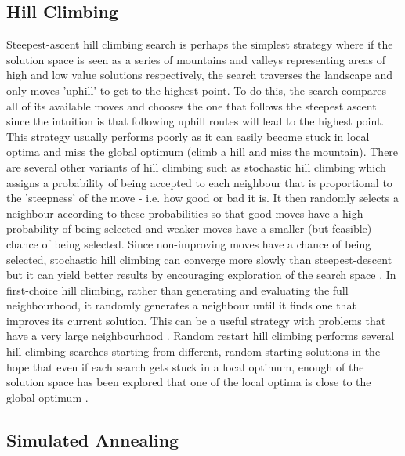 \subsection{Hill Climbing}

Steepest-ascent hill climbing search \citep{russell2016artificial} is perhaps the simplest strategy where if the solution space is seen as a series of mountains and valleys representing areas of high and low value solutions respectively, the search traverses the landscape and only moves 'uphill' to get to the highest point. To do this, the search compares all of its available moves and chooses the one that follows the steepest ascent since the intuition is that following uphill routes will lead to the highest point. This strategy usually performs poorly as it can easily become stuck in local optima and miss the global optimum (climb a hill and miss the mountain). There are several other variants of hill climbing such as stochastic hill climbing which assigns a probability of being accepted to each neighbour that is proportional to the 'steepness' of the move - i.e. how good or bad it is. It then randomly selects a neighbour according to these probabilities so that good moves have a high probability of being selected and weaker moves have a smaller (but feasible) chance of being selected. Since non-improving moves have a chance of being selected, stochastic hill climbing can converge more slowly than steepest-descent but it can yield better results by encouraging exploration of the search space \citep{russell2016artificial}. In first-choice hill climbing, rather than generating and evaluating the full neighbourhood, it randomly generates a neighbour until it finds one that improves its current solution. This can be a useful strategy with problems that have a very large neighbourhood \citep{russell2016artificial}. Random restart hill climbing performs several hill-climbing searches starting from different, random starting solutions in the hope that even if each search gets stuck in a local optimum, enough of the solution space has been explored that one of the local optima is close to the global optimum \citep{russell2016artificial}.

\subsection{Simulated Annealing}

